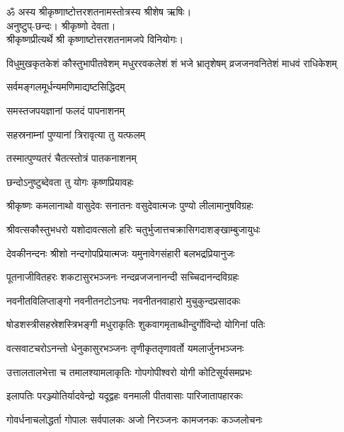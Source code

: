 ॐ अस्य श्रीकृष्णाष्टोत्तरशतनामस्तोत्रस्य श्रीशेष ऋषिः।\\
अनुष्टुप्-छन्दः। श्रीकृष्णो देवता।\\
 श्रीकृष्णप्रीत्यर्थे श्री कृष्णाष्टोत्तरशतनामजपे विनियोगः।

{विधुमुखकृतकेशं कौस्तुभापीतवेशम्}
{मधुररवकलेशं शं भजे भ्रातृशेषम्}
{व्रजजनवनितेशं माधवं राधिकेशम्}


{सर्वमङ्गलमूर्धन्यमणिमाद्यष्टसिद्धिदम्}

{समस्तजपयज्ञानां फलदं पापनाशनम्}

{सहस्रनाम्नां पुण्यानां त्रिरावृत्या तु यत्फलम्}

{तस्मात्पुण्यतरं चैतत्स्तोत्रं पातकनाशनम्}

{छन्दोऽनुष्टुब्देवता तु योगः कृष्णप्रियावहः}

\twolineshloka
{श्रीकृष्णः कमलानाथो वासुदेवः सनातनः}
{वसुदेवात्मजः पुण्यो लीलामानुषविग्रहः}

\twolineshloka
{श्रीवत्सकौस्तुभधरो यशोदावत्सलो हरिः}
{चतुर्भुजात्तचक्रासिगदाशङ्खाम्बुजायुधः}

\twolineshloka
{देवकीनन्दनः श्रीशो नन्दगोपप्रियात्मजः}
{यमुनावेगसंहारी बलभद्रप्रियानुजः}

\twolineshloka
{पूतनाजीवितहरः शकटासुरभञ्जनः}
{नन्दव्रजजनानन्दी सच्चिदानन्दविग्रहः}

\twolineshloka
{नवनीतविलिप्ताङ्गो नवनीतनटोऽनघः}
{नवनीतनवाहारो मुचुकुन्दप्रसादकः}

\twolineshloka
{षोडशस्त्रीसहस्रेशस्त्रिभङ्गी मधुराकृतिः}
{शुकवागमृताब्धीन्दुर्गोविन्दो योगिनां पतिः}

\twolineshloka
{वत्सवाटचरोऽनन्तो धेनुकासुरभञ्जनः}
{तृणीकृततृणावर्तो यमलार्जुनभञ्जनः}

\twolineshloka
{उत्तालतालभेत्ता च तमालश्यामलाकृतिः}
{गोपगोपीश्वरो योगी कोटिसूर्यसमप्रभः}

\twolineshloka
{इलापतिः परञ्ज्योतिर्यादवेन्द्रो यदूद्वहः}
{वनमाली पीतवासाः पारिजातापहारकः}

\twolineshloka
{गोवर्धनाचलोद्धर्ता गोपालः सर्वपालकः}
{अजो निरञ्जनः कामजनकः कञ्जलोचनः}

